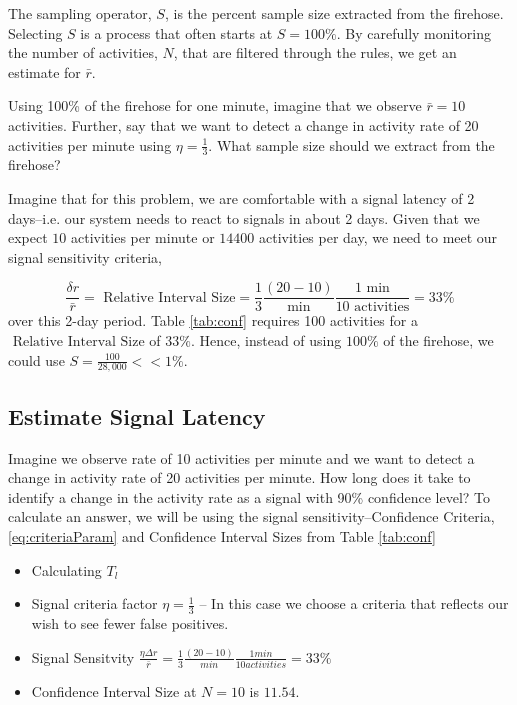 \documentclass{article}
\begin{document}
The sampling operator, $S$, is the percent sample size extracted from the firehose.  Selecting $S$ is a process 
that often starts at $S =100\%$.  By carefully monitoring the number of activities, $N$, that are filtered through
the rules, we get an estimate for $\bar{r}$.

Using 100\% of the firehose for one minute, imagine that we observe $\bar{r}=10$ activities.  Further, say that 
we want to detect a change in activity rate of 20 activities per minute using $\eta = \frac{1}{3}$.  What sample
size should we extract from the firehose?  

Imagine that for this problem, we are comfortable with a signal latency of 2 days--i.e. our system needs to 
react to signals in about 2 days.  Given that we expect $10$ activities per minute or $14400$ activities per day, 
we need to meet our signal sensitivity criteria,

\begin{equation}
\label{eq:ex1:criteria}
\frac{\delta r}{\bar{r}} = \text{ Relative Interval Size} = \frac{1}{3}\frac{(20-10)}{\text{min}} \frac{1 \text{ min}}{10 \text{ activities}}= 33\% 
\end{equation}
over this 2-day period.  Table \ref{tab:conf} requires 100 activities for a $\text{ Relative Interval Size}$ of $33\%$. Hence, 
instead of using $100\%$ of the firehose, we could use $S = \frac{100}{28,000} << 1\%$.
   
\subsection{Estimate Signal Latency} 
\label{ex:2}

Imagine we observe rate of 10 activities per minute and we want to detect a change in activity rate of 20 activities
per minute.  How long does it take to identify a change in the activity rate as a signal with 90\% confidence level? 
To calculate an answer, we will be using the signal sensitivity--Confidence Criteria, \ref{eq:criteriaParam} and 
Confidence Interval Sizes from Table \ref{tab:conf}

\begin{itemize}
\item Calculating $T_{l}$
\item Signal criteria factor $\eta=\frac{1}{3}$ -- In this case we choose a criteria that reflects our wish to see fewer false positives.
\item Signal Sensitvity $\frac{\eta \Delta r}{\bar{r}} = \frac{1}{3}\frac{(20-10)}{min} \frac{1 min}{10 activities}= 33\%$
\item Confidence Interval Size at $N =10$ is $11.54$. %
\end{itemize}
\end{document}
